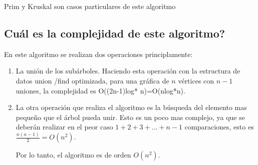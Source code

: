 \documentclass[9pt,spanish]{article}
\numberwithin{equation}{section}
\begin{document}
Prim y Kruskal son casos particulares de este algoritmo

\subsection*{Cu\'al es la complejidad de este algoritmo?}

En este algoritmo se realizan dos operaciones principlamente:
\begin{enumerate}
\item La uni\'on de los sub\'arboles.  Haciendo esta operaci\'on con la estructura de datos union /find optimizada, para una gr\'afica de $n$  v\'ertices con $n-1$ uniones, la complejidad es O((2n-1)log* n)=O(nlog*n).
\item La otra operaci\'on que realiza el algoritmo es la b\'usqueda del elemento mas peque\~no que el \'arbol pueda unir.  Esto es un poco mas complejo, ya que se deber\'an realizar en el peor caso $1 + 2 + 3 +...+n-1$ comparaciones, esto es $\frac{n(n-1)}{2}=O(n^2)$.

Por lo tanto, el algoritmo es de orden $O(n^2).$



\end{enumerate}
\end{document}
